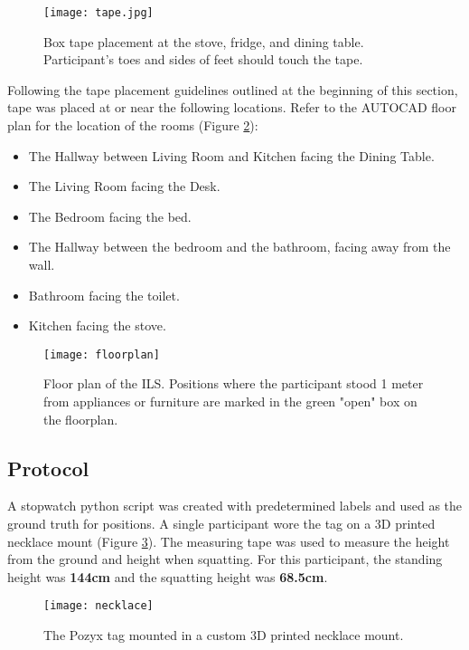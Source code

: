 \begin{figure}[ht]
    \centering
    \texttt{[image: tape.jpg]}
    \caption{Box tape placement at the stove, fridge, and dining table. Participant's toes 
    and sides of feet should touch the tape.}
    \label{fig:tape}
\end{figure}

Following the tape placement guidelines outlined at the beginning of this section,
tape was placed at or near the following locations. Refer to the AUTOCAD floor plan for 
the location of the rooms (Figure \ref{fig:floorplan}):
\begin{itemize}
    \item The Hallway between Living Room and Kitchen facing the Dining Table.
    \item The Living Room facing the Desk.
    \item The Bedroom facing the bed.
    \item The Hallway between the bedroom and the bathroom, facing away from the wall.
    \item Bathroom facing the toilet.
    \item Kitchen facing the stove.
\end{itemize}

\begin{figure}[ht]
    \centering
    \texttt{[image: floorplan]}
    \caption{Floor plan of the ILS. Positions where the participant stood 1 meter
    from appliances or furniture are marked in the green "open" box on the floorplan.
    }
    \label{fig:floorplan}
\end{figure}

\clearpage
\subsection{Protocol}
A stopwatch python script was created with predetermined labels and used as the ground truth 
for positions. A single participant wore the tag on a 3D printed necklace mount (Figure \ref{fig:necklace}). 
The measuring tape was used to measure the height from the ground and height when squatting.
For this participant, the standing height was \textbf{144cm} and the squatting height was \textbf{68.5cm}.

\begin{figure}[ht]
    \centering
    \texttt{[image: necklace]}
    \caption{The Pozyx tag mounted in a custom 3D printed necklace mount.}
    \label{fig:necklace}
\end{figure}

